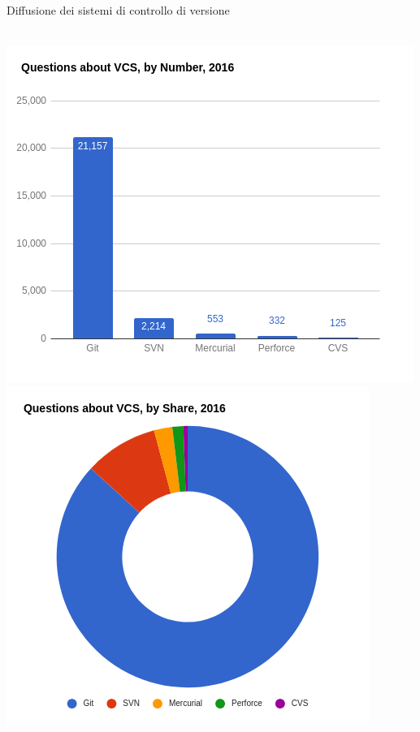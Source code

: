 \documentclass[presentation]{beamer}
\begin{document}
\begin{frame}[allowframebreaks]{Diffusione dei sistemi di controllo di versione}
\begin{center}
\\
        \includegraphics[width=\textwidth, height=.77\textheight, 
keepaspectratio]{img/questionsbynum} \\
        \includegraphics[width=\textwidth, height=.77\textheight, 
keepaspectratio]{img/questionsbyshare} \\

\end{center}
\end{frame}
\end{document}
